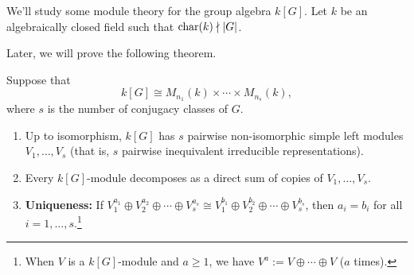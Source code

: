 We'll study some module theory for the group algebra $k[G]$. Let 
$k$ be an algebraically closed field such that $\operatorname{char}(k) \nmid |G|$. 

Later, we will prove the following theorem. 

\begin{thm}
    Suppose that 
    \[ k[G] \cong M_{n_1}(k) \times \cdots \times M_{n_s}(k), \] 
    where $s$ is the number of conjugacy classes of $G$. 
    \begin{enumerate}[(1)]
        \item Up to isomorphism, $k[G]$ has $s$ pairwise non-isomorphic 
        simple left modules $V_1, \dots, V_s$ (that is, $s$ pairwise 
        inequivalent irreducible representations). 
        \item Every $k[G]$-module decomposes as a direct sum of copies of 
        $V_1, \dots, V_s$. 
        \item {\bf Uniqueness:} If $V_1^{a_1} \oplus V_2^{a_2} \oplus 
        \cdots \oplus V_s^{a_s} \cong V_1^{b_1} \oplus V_2^{b_2} \oplus 
        \cdots \oplus V_s^{b_s}$, then $a_i = b_i$ for all 
        $i = 1, \dots, s$.\footnote[1]{When $V$ is a $k[G]$-module 
        and $a \geq 1$, we have $V^a := V \oplus \cdots \oplus V$ 
        ($a$ times).}
    \end{enumerate}
\end{thm}
